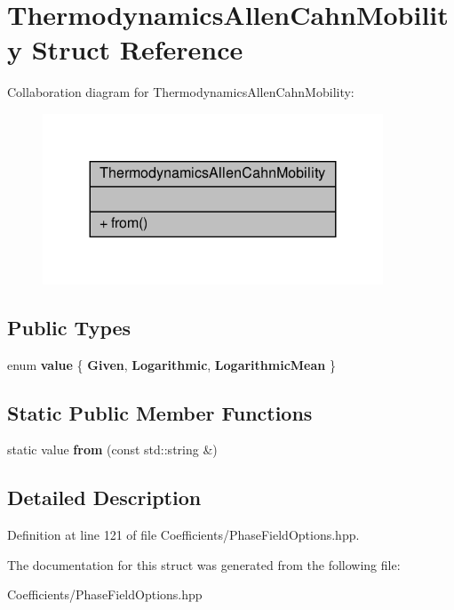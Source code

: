 \hypertarget{structThermodynamicsAllenCahnMobility}{}\section{Thermodynamics\+Allen\+Cahn\+Mobility Struct Reference}
\label{structThermodynamicsAllenCahnMobility}


Collaboration diagram for Thermodynamics\+Allen\+Cahn\+Mobility\+:\nopagebreak
\begin{figure}[H]
\begin{center}
\leavevmode
\includegraphics[width=287pt]{structThermodynamicsAllenCahnMobility__coll__graph}
\end{center}
\end{figure}
\subsection*{Public Types}
\begin{DoxyCompactItemize}
\item 
\mbox{\label{structThermodynamicsAllenCahnMobility_abda1df251074dcdcd141f9f7aaf25a18}} 
enum {\bfseries value} \{ {\bfseries Given}, 
{\bfseries Logarithmic}, 
{\bfseries Logarithmic\+Mean}
 \}
\end{DoxyCompactItemize}
\subsection*{Static Public Member Functions}
\begin{DoxyCompactItemize}
\item 
\mbox{\label{structThermodynamicsAllenCahnMobility_a7e8ab14f9a4481553ece72e4ed905c21}} 
static value {\bfseries from} (const std\+::string \&)
\end{DoxyCompactItemize}


\subsection{Detailed Description}


Definition at line 121 of file Coefficients/\+Phase\+Field\+Options.\+hpp.



The documentation for this struct was generated from the following file\+:\begin{DoxyCompactItemize}
\item 
Coefficients/\+Phase\+Field\+Options.\+hpp\end{DoxyCompactItemize}

